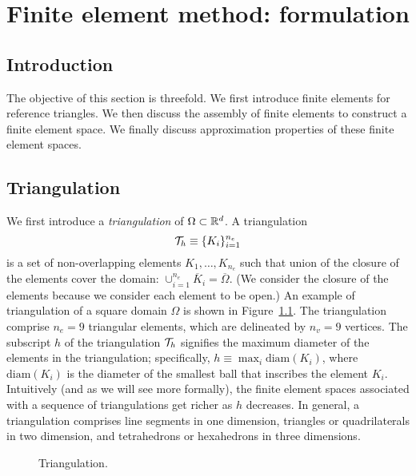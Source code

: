 \chapter{Finite element method: formulation}

\disclaimer

\section{Introduction}
The objective of this section is threefold.  We first introduce finite elements for reference triangles. We then discuss the assembly of finite elements to construct a finite element space.  We finally discuss approximation properties of these finite element spaces.

\section{Triangulation}
We first introduce a \emph{triangulation} of $\Omega \subset \mathbb{R}^d$.  A triangulation
\begin{equation*}
  \mathcal{T}_h \equiv \{ K_i \}_{i=1}^{n_e}
\end{equation*}
is a set of non-overlapping elements $K_1, \dots, K_{n_e}$ such that union of the closure of the elements cover the domain: $\cup_{i=1}^{n_e} \overline K_i = \overline \Omega$.   (We consider the closure of the elements because we consider each element to be open.) An example of triangulation of a square domain $\Omega$ is shown in Figure~\ref{fig:fe_mesh_p1}. The triangulation comprise $n_e = 9$ triangular elements, which are delineated by $n_v = 9$ vertices.  The subscript $h$ of the triangulation $\mathcal{T}_h$ signifies the maximum diameter of the elements in the triangulation; specifically, $h \equiv \max_{i} \text{diam}(K_i)$, where $\text{diam}(K_i)$ is the diameter of the smallest ball that inscribes the element $K_i$.  Intuitively (and as we will see more formally), the finite element spaces associated with a sequence of triangulations get richer as $h$ decreases.  In general, a triangulation comprises line segments in one dimension, triangles or quadrilaterals in two dimension, and tetrahedrons or hexahedrons in three dimensions.


\begin{figure}
  \centering
  \caption{Triangulation.}
  \label{fig:fe_mesh_p1}
\end{figure}

